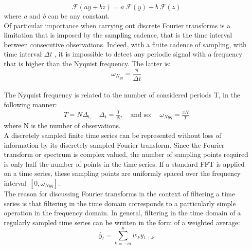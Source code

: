 \documentclass[english,blauw]{cbsdiscussionpaper}
\begin{document}
\begin{equation}
\mathcal{F}(\textit{a} y + \textit{b} z) = \textit{a} \ \mathcal{F}(y)+ \textit{b} \ \mathcal{F}(z)
\end{equation}
where \textit{a} and \textit{b} can be any constant.\\Of particular importance when carrying out discrete Fourier transforms is a limitation that is imposed by the sampling cadence, that is the time interval between consecutive observations. Indeed, with a finite cadence of sampling, with time interval $\Delta t$ , it is impossible to detect any periodic signal with a frequency that is higher than the Nyquist frequency. The latter is:
\begin{equation}
\omega_{N_{yq}} = \frac {\pi}{\Delta t}
\end{equation}\\
The Nyquist frequency is related to the number of considered periods T, in the following manner:
\begin{equation*}
\begin{split}
T=N\Delta_{t,}\quad \Delta_{t}=\frac{T}{N},\quad \text{and so}: \quad \omega_{Nyq}=\frac{\pi N}{T}
\end{split}
\end{equation*}
where N is the number of observations.\\
A discretely sampled finite time series can be represented without loss of information by its discretely sampled Fourier transform. Since the Fourier transform or spectrum is complex valued, the number of sampling points required is only half the number of points in the time series. If a standard FFT is applied on a time series, these sampling points are uniformly spaced over the frequency interval\ $[0,\omega_{Nyq}]$.\\The reason for discussing Fourier transforms in the context of filtering a time series is that filtering in the time domain corresponds to a particularly simple operation in the frequency domain. In general, filtering in the time domain of a regularly sampled time series can be written in the form of a weighted average:
\begin{equation}
\tilde {y_t} = \sum\limits_{k=-m}^{n} \textit{w$_k$}\textit{y$_{t+k}$}
\end{equation}
\end{document}
